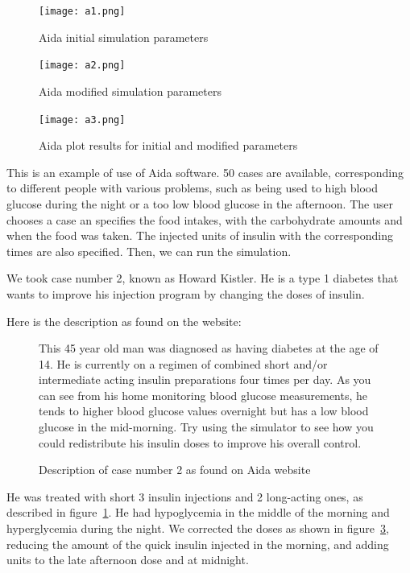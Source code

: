 \documentclass[12pt,MSc]{muthesis}
\begin{document}
\begin{figure}[h]
  \caption{Aida initial simulation parameters}
  \centering
  \texttt{[image: a1.png]}
  \label{a1}
\end{figure}

\begin{figure}[h]
  \caption{Aida modified simulation parameters}
  \centering
  \texttt{[image: a2.png]}
  \label{a2}
\end{figure}

\begin{figure}[h]
  \caption{Aida plot results for initial and modified parameters}
  \centering
  \texttt{[image: a3.png]}
  \label{a3}
\end{figure}


This is an example of use of Aida software. 50 cases are available, corresponding to different people with various problems, such as being used to high blood glucose during the night or a too low blood glucose in the afternoon.
The user chooses a case an specifies the food intakes, with the carbohydrate amounts and when the food was taken. The injected units of insulin with the corresponding times are also specified. Then, we can run the simulation.

We took case number 2, known as Howard Kistler. He is a type 1 diabetes that wants to improve his injection program by changing the doses of insulin. 

Here is the description as found on the website:

\begin{figure}[h]
  \caption{Description of case number 2 as found on Aida website}
  This 45 year old man was diagnosed as having diabetes at the 
age of 14. He is currently on a regimen of combined short 
and/or intermediate acting insulin preparations four times 
per day.  As you can see from his home monitoring blood 
glucose measurements, he tends to higher blood glucose 
values overnight but has a low blood glucose in the 
mid-morning.  Try using the simulator to see how you 
could redistribute his insulin doses to improve his 
overall control.
  \centering
\\  \label{descriptionCaseAida}
\end{figure}


He was treated with short 3 insulin injections and 2 long-acting ones, as described in figure~\ref{a1}. He had hypoglycemia in the middle of the morning and hyperglycemia during the night.
We corrected the doses as shown in figure~\ref{a3}, reducing the amount of the quick insulin injected in the morning, and adding units to the late afternoon dose and at midnight.
\end{document}
